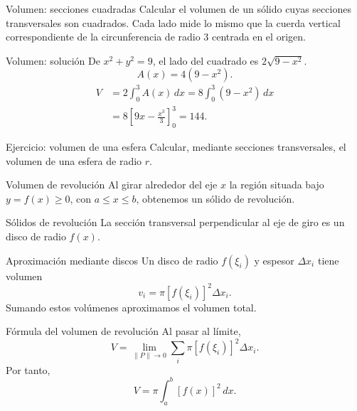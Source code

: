 \documentclass[original_version/main.tex]{subfiles}
\begin{document}
\begin{frame}{Volumen: secciones cuadradas}
Calcular el volumen de un sólido cuyas secciones transversales son cuadrados. Cada lado mide lo mismo que la cuerda vertical correspondiente de la circunferencia de radio $3$ centrada en el origen.
\end{frame}

\begin{frame}{Volumen: solución}
\small De $x^2+y^2=9$, el lado del cuadrado es $2\sqrt{9-x^2}$.\[A(x)=4(9-x^2).\]\begin{align*}V&=2\int_0^3A(x)\,dx=8\int_0^3(9-x^2)\,dx\\&=8\left[9x-\frac{x^3}{3}\right]_0^3=\boxed{144}.\end{align*}
\end{frame}

\begin{frame}{Ejercicio: volumen de una esfera}
Calcular, mediante secciones transversales, el volumen de una esfera de radio $r$.
\end{frame}

\begin{frame}{Volumen de revolución}
Al girar alrededor del eje $x$ la región situada bajo $y=f(x)\ge0$, con $a\le x\le b$, obtenemos un sólido de revolución.
\end{frame}

\begin{frame}{Sólidos de revolución}
La sección transversal perpendicular al eje de giro es un disco de radio $f(x)$.
\end{frame}

\begin{frame}{Aproximación mediante discos}
\small Un disco de radio $f(\xi_i)$ y espesor $\Delta x_i$ tiene volumen\[v_i=\pi[f(\xi_i)]^2\Delta x_i.\]Sumando estos volúmenes aproximamos el volumen total.
\end{frame}

\begin{frame}{Fórmula del volumen de revolución}
Al pasar al límite,\[V=\lim_{\|P\|\to0}\sum_i\pi[f(\xi_i)]^2\Delta x_i.\]Por tanto,\[\boxed{V=\pi\int_a^b[f(x)]^2\,dx.}\]
\end{frame}
\end{document}
